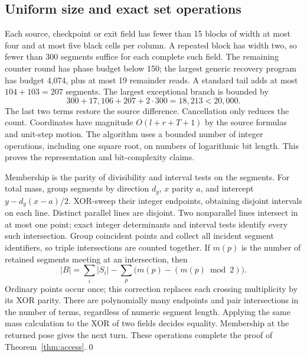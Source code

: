 \subsection{Uniform size and exact set operations}
Each source, checkpoint or exit field has fewer than 15 blocks of width at most
four and at most five black cells per column. A repeated block has width two,
so fewer than 300 segments suffice for each complete such field. The remaining
counter round has phase budget below 150; the largest generic recovery program
has budget 4,074, plus at most 19 remainder reads. A standard tail adds at most
$104+103=207$ segments. The largest exceptional branch is bounded by
\[
 300+17,106+207+2\cdot300=18,213<20,000.
\]
The last two terms restore the source difference. Cancellation only reduces
the count. Coordinates have magnitude $O(l+r+T+1)$ by the source formulas and
unit-step motion. The algorithm uses a bounded number of integer operations,
including one square root, on numbers of logarithmic bit length. This proves
the representation and bit-complexity claims.

Membership is the parity of divisibility and interval tests on the segments.
For total mass, group segments by direction $d_y$, $x$ parity $a$, and intercept
$y-d_y(x-a)/2$. XOR-sweep their integer endpoints, obtaining disjoint intervals
on each line. Distinct parallel lines are disjoint. Two nonparallel lines
intersect in at most one point; exact integer determinants and interval tests
identify every such intersection. Group coincident points and collect all
incident segment identifiers, so triple intersections are counted together.
If $m(p)$ is the number of retained segments meeting at an intersection, then
\[
 |B|=\sum_i |S_i|-\sum_p\bigl(m(p)-(m(p)\bmod2)\bigr).
\]
Ordinary points occur once; this correction replaces each crossing multiplicity
by its XOR parity. There are polynomially many endpoints and pair intersections
in the number of terms, regardless of numeric segment length. Applying the
same mass calculation to the XOR of two fields decides equality. Membership
at the returned pose gives the next turn. These operations complete the proof
of Theorem~\ref{thm:access}.\qed
